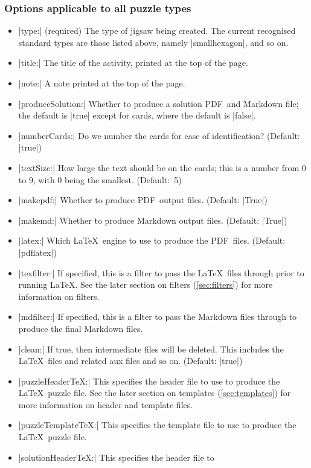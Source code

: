\documentclass{article}
\def\PDF{{\small PDF}}
\begin{document}
\subsubsection*{Options applicable to all puzzle types}

\begin{itemize}
\item |type:| (required) The type of jigsaw being created.  The
  current recognised standard types are those listed above, namely
  |smallhexagon|, and so on.
\item |title:| The title of the activity, printed at
  the top of the page.
\item |note:| A note printed at the top of the page.
\item |produceSolution:| Whether to produce a solution \PDF\ and
  Markdown file; the default is |true| except for cards, where
  the default is |false|.
\item |numberCards:| Do we number the cards for ease of
  identification?  (Default: |true|)
\item |textSize:| How large the text should be on the cards; this
  is a number from 0 to 9, with 0 being the smallest.  (Default:~5)
\item |makepdf:| Whether to produce \PDF\ output files.  (Default:
  |True|)
\item |makemd:| Whether to produce Markdown output files.  (Default:
  |True|)
\item |latex:| Which \LaTeX\ engine to use to produce the \PDF\
  files.  (Default: |pdflatex|)
\item |texfilter:| If specified, this is a filter to pass the \LaTeX\
  files through prior to running \LaTeX.  See the later section on
  filters (\ref{sec:filters}) for more information on filters.
\item |mdfilter:| If specified, this is a filter to pass the Markdown
  files through to produce the final Markdown files.
\item |clean:| If true, then intermediate files will be deleted.
  This includes the \LaTeX\ files and related aux files and so on.
  (Default: |true|)
\item |puzzleHeaderTeX:| This specifies the header file to use to
  produce the \LaTeX\ puzzle file.  See the later section on templates
  (\ref{sec:templates}) for more information on header and template
  files.
\item |puzzleTemplateTeX:| This specifies the template file to
  use to produce the \LaTeX\ puzzle file.
\item |solutionHeaderTeX:| This specifies the header file to

\end{itemize}
\end{document}

